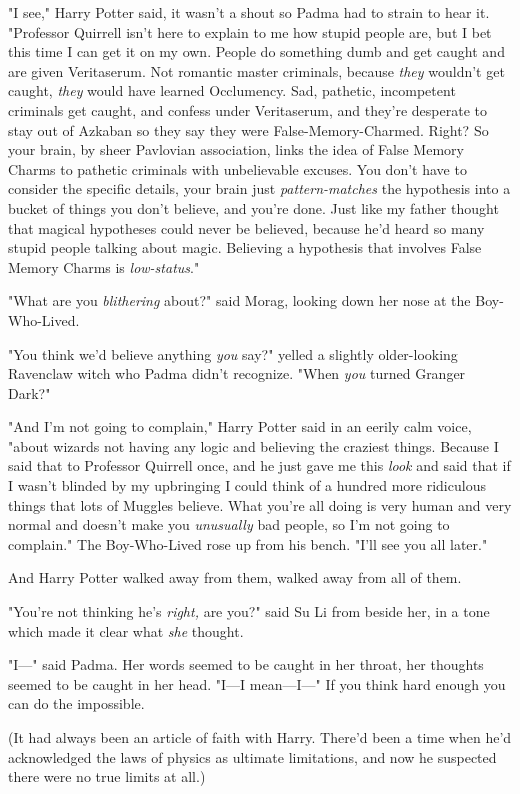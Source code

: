 "I see," Harry Potter said, it wasn't a shout so Padma had to strain to hear it. "Professor Quirrell isn't here to explain to me how stupid people are, but I bet this time I can get it on my own. People do something dumb and get caught and are given Veritaserum. Not romantic master criminals, because \emph{they} wouldn't get caught, \emph{they} would have learned Occlumency. Sad, pathetic, incompetent criminals get caught, and confess under Veritaserum, and they're desperate to stay out of Azkaban so they say they were False-Memory-Charmed. Right? So your brain, by sheer Pavlovian association, links the idea of False Memory Charms to pathetic criminals with unbelievable excuses. You don't have to consider the specific details, your brain just \emph{pattern-matches} the hypothesis into a bucket of things you don't believe, and you're done. Just like my father thought that magical hypotheses could never be believed, because he'd heard so many stupid people talking about magic. Believing a hypothesis that involves False Memory Charms is \emph{low-status}."

"What are you \emph{blithering} about?" said Morag, looking down her nose at the Boy-Who-Lived.

"You think we'd believe anything \emph{you} say?" yelled a slightly older-looking Ravenclaw witch who Padma didn't recognize. "When \emph{you} turned Granger Dark?"

"And I'm not going to complain," Harry Potter said in an eerily calm voice, "about wizards not having any logic and believing the craziest things. Because I said that to Professor Quirrell once, and he just gave me this \emph{look} and said that if I wasn't blinded by my upbringing I could think of a hundred more ridiculous things that lots of Muggles believe. What you're all doing is very human and very normal and doesn't make you \emph{unusually} bad people, so I'm not going to complain." The Boy-Who-Lived rose up from his bench. "I'll see you all later."

And Harry Potter walked away from them, walked away from all of them.

"You're not thinking he's \emph{right,} are you?" said Su Li from beside her, in a tone which made it clear what \emph{she} thought.

"I---" said Padma. Her words seemed to be caught in her throat, her thoughts seemed to be caught in her head. "I---I mean---I---"
\sbreak
If you think hard enough you can do the impossible.

(It had always been an article of faith with Harry. There'd been a time when he'd acknowledged the laws of physics as ultimate limitations, and now he suspected there were no true limits at all.)

